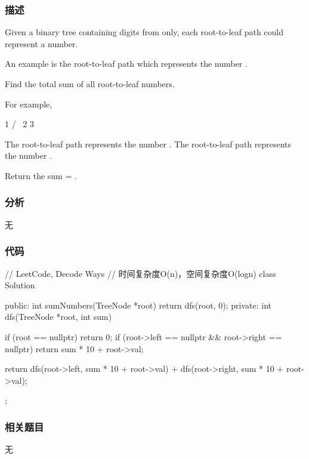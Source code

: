\subsubsection{描述}
Given a binary tree containing digits from  only, each root-to-leaf path could represent a number.

An example is the root-to-leaf path  which represents the number .

Find the total sum of all root-to-leaf numbers.

For example,
\begin{Code}
    1
   / \
  2   3
\end{Code}

The root-to-leaf path  represents the number .
The root-to-leaf path  represents the number .

Return the sum = .


\subsubsection{分析}
无

\subsubsection{代码}

\begin{Code}
// LeetCode, Decode Ways
// 时间复杂度O(n)，空间复杂度O(logn)
class Solution {
public:
    int sumNumbers(TreeNode *root) {
        return dfs(root, 0);
    }
private:
    int dfs(TreeNode *root, int sum) {
        if (root == nullptr) return 0;
        if (root->left == nullptr && root->right == nullptr)
            return sum * 10 + root->val;

        return dfs(root->left, sum * 10 + root->val) +
                dfs(root->right, sum * 10 + root->val);
    }
};
\end{Code}


\subsubsection{相关题目}
\begindot
\item 无
\myenddot
